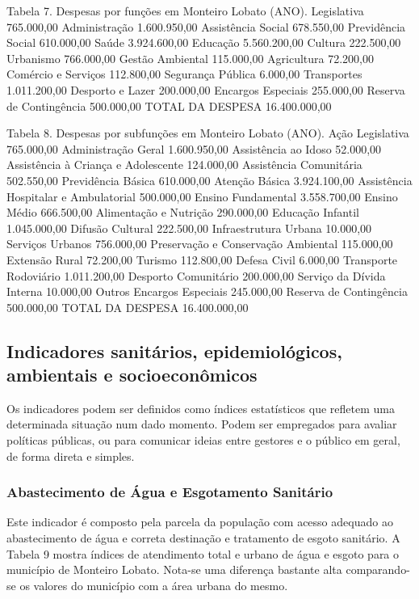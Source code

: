Tabela 7.  Despesas por funções em Monteiro Lobato (ANO).
Legislativa	765.000,00
Administração	1.600.950,00
Assistência Social	678.550,00
Previdência Social	610.000,00
Saúde	3.924.600,00
Educação	5.560.200,00
Cultura	222.500,00
Urbanismo	766.000,00
Gestão Ambiental	115.000,00
Agricultura	72.200,00
Comércio e Serviços	112.800,00
Segurança Pública	6.000,00
Transportes	1.011.200,00
Desporto e Lazer	200.000,00
Encargos Especiais	255.000,00
Reserva de Contingência	500.000,00
TOTAL DA DESPESA	16.400.000,00

Tabela 8. Despesas por subfunções em Monteiro Lobato (ANO).
Ação Legislativa	765.000,00
Administração Geral 	1.600.950,00
Assistência ao Idoso	52.000,00
Assistência à Criança e Adolescente 	124.000,00
Assistência Comunitária 	502.550,00
Previdência Básica	610.000,00
Atenção Básica	3.924.100,00
Assistência Hospitalar e Ambulatorial	500.000,00
Ensino Fundamental	3.558.700,00
Ensino Médio 	666.500,00
Alimentação e Nutrição 	290.000,00
Educação Infantil	1.045.000,00
Difusão Cultural 	222.500,00
Infraestrutura Urbana	10.000,00
Serviços Urbanos	756.000,00
Preservação e Conservação Ambiental 	115.000,00
Extensão Rural	72.200,00
Turismo	112.800,00
Defesa Civil	6.000,00
Transporte Rodoviário	1.011.200,00
Desporto Comunitário	200.000,00
Serviço da Dívida Interna	10.000,00
Outros Encargos Especiais	245.000,00
Reserva de Contingência	500.000,00
TOTAL DA DESPESA	16.400.000,00

\subsection{Indicadores sanitários, epidemiológicos, ambientais e socioeconômicos}
Os indicadores podem ser definidos como índices estatísticos que refletem uma determinada situação num dado momento. Podem ser empregados para avaliar políticas públicas, ou para comunicar ideias entre gestores e o público em geral, de forma direta e simples.
\subsubsection{Abastecimento de Água e Esgotamento Sanitário}
Este indicador é composto pela parcela da população com acesso adequado ao abastecimento de água e correta destinação e tratamento de esgoto sanitário. A Tabela 9 mostra índices de atendimento total e urbano de água e esgoto para o município de Monteiro Lobato. Nota-se uma diferença bastante alta comparando-se os valores do município com a área urbana do mesmo.



